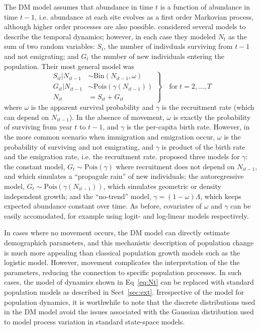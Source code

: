 \documentclass[12pt]{article}
\begin{document}
The DM model assumes that abundance in time $t$ is a function of
abundance in time $t-1$, i.e. abundance at each site evolves as a
first order Markovian process, although
higher order processes are also possible.  \citet{dail_madsen:2011}
considered several models to describe the temporal dynamics; however,
in each case they modeled $N_t$ as the sum of two random variables:
$S_t$, the number of indivduals surviving from $t-1$ and not
emigrating; and $G_t$ the number of new individuals entering the
population. Their most general model was
\begin{equation}
\left.\begin{aligned}
S_{it}|N_{it-1} &\sim \mathrm{Bin}(N_{it-1}, \omega) \\
G_{it}|N_{it-1} &\sim \mathrm{Pois}(\gamma(N_{it-1})) \\
N_{it} &= S_{it}+G_{it}
\end{aligned}\right\} \quad \text{for} \; t=2,\hdots,T
\label{eq:Nt}
\end{equation}
where $\omega$ is the apparent survival probability and $\gamma$ is
the recruitment rate (which can depend on $N_{it-1}$). In the absence
of movement, $\omega$ is exactly the probability of surviving from
year $t$ to $t-1$, and $\gamma$ is the per-capita birth rate. However,
in the more common scenario when immigration and emigration occur,
$\omega$ is the probability of surviving and not emigrating, and
$\gamma$ is product of the birth rate and the emigration rate,
i.e. the recruitment rate. \citet{dail_madsen:2011} proposed three
models for $\gamma$: the constant model,
$G_t \sim \mathrm{Pois}(\gamma)$ where recruitment does not depend on
$N_{it-1}$, and which simulates a ``propagule rain'' of new individuals; the
autoregressive model, $G_t \sim \mathrm{Pois}(\gamma(N_{it-1}))$, which
simulates geometric or density independent growth; and the
``no-trend'' model, $\gamma = (1-\omega)\Lambda$, which keeps
expected abundance constant over time. As before, covariates of
$\omega$ and $\gamma$ can be easily accomodated, for example using
logit- and log-linear models respectively.

In cases where no movement occurs, the DM model can directly estimate
demographich parameters, and this mechanistic description of
population change is much more appealing than classical
population growth models such as the logistic model. However, movement
complicates the interpretation of the the parameters, reducing the
connection to specific population processes. In such cases, the model
of dynamics shown in Eq~\ref{eq:Nt} can be replaced with standard
population models as described in Sect~\ref{sec:ext}. Irrespective of
the model for population dynamics, it is worthwhile to note that the
discrete distributions used in the DM model avoid the issues
associated with the Gaussian distribution used to model process
variation in standard state-space models.
\end{document}
